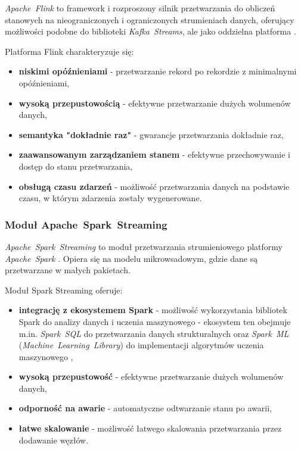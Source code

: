 \mbox{\textit{Apache Flink}} to framework i rozproszony silnik przetwarzania do obliczeń stanowych na nieograniczonych i ograniczonych strumieniach danych, oferujący możliwości podobne do biblioteki \mbox{\textit{Kafka Streams}},
ale jako oddzielna platforma \cite{flink}. 

\vspace{0.3em}

Platforma Flink charakteryzuje się:

\begin{itemize}
    \item \textbf{niskimi opóźnieniami} - przetwarzanie rekord po rekordzie z minimalnymi opóźnieniami,
    \item \textbf{wysoką przepustowością} - efektywne przetwarzanie dużych wolumenów danych,
    \item \textbf{semantyka "dokładnie raz"} - gwarancje przetwarzania dokładnie raz,
    \item \textbf{zaawansowanym zarządzaniem stanem} - efektywne przechowywanie i dostęp do stanu przetwarzania,
    \item \textbf{obsługą czasu zdarzeń} - możliwość przetwarzania danych na podstawie czasu, w którym zdarzenia zostały wygenerowane.
\end{itemize}

\subsubsection{Moduł \mbox{Apache Spark Streaming}}
\label{subsubsec:spark_streaming}

\mbox{\textit{Apache Spark Streaming}} to moduł przetwarzania strumieniowego platformy \mbox{\textit{Apache Spark}} \cite{spark_streaming}.
Opiera się na modelu mikrowsadowym, gdzie dane są przetwarzane w małych pakietach. 

\vspace{0.3em}

Moduł Spark Streaming oferuje:

\begin{itemize}
    \item \textbf{integrację z ekosystemem Spark} - możliwość wykorzystania bibliotek Spark do analizy danych i uczenia maszynowego - ekosystem ten obejmuje m.in. \mbox{\textit{Spark SQL}} do przetwarzania danych strukturalnych \cite{chambers2018spark} oraz \mbox{\textit{Spark ML}} (\mbox{\textit{Machine Learning Library}}) do implementacji algorytmów uczenia maszynowego \cite{chambers2018spark},
    \item \textbf{wysoką przepustowość} - efektywne przetwarzanie dużych wolumenów danych,
    \item \textbf{odporność na awarie} - automatyczne odtwarzanie stanu po awarii,
    \item \textbf{łatwe skalowanie} - możliwość łatwego skalowania przetwarzania przez dodawanie węzłów.
\end{itemize}

